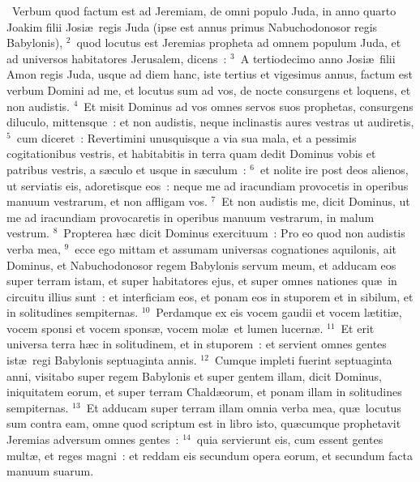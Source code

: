 ~Verbum quod factum est ad Jeremiam, de omni populo Juda, in anno quarto Joakim filii Josi\ae\ regis Juda (ipse est annus primus Nabuchodonosor regis Babylonis),
${}^{2}$~quod locutus est Jeremias propheta ad omnem populum Juda, et ad universos habitatores Jerusalem, dicens~:
${}^{3}$~A tertiodecimo anno Josi\ae\ filii Amon regis Juda, usque ad diem hanc, iste tertius et vigesimus annus, factum est verbum Domini ad me, et locutus sum ad vos, de nocte consurgens et loquens, et non audistis.
${}^{4}$~Et misit Dominus ad vos omnes servos suos prophetas, consurgens diluculo, mittensque~: et non audistis, neque inclinastis aures vestras ut audiretis,
${}^{5}$~cum diceret~: Revertimini unusquisque a via sua mala, et a pessimis cogitationibus vestris, et habitabitis in terra quam dedit Dominus vobis et patribus vestris, a s\ae culo et usque in s\ae culum~:
${}^{6}$~et nolite ire post deos alienos, ut serviatis eis, adoretisque eos~: neque me ad iracundiam provocetis in operibus manuum vestrarum, et non affligam vos.
${}^{7}$~Et non audistis me, dicit Dominus, ut me ad iracundiam provocaretis in operibus manuum vestrarum, in malum vestrum.
${}^{8}$~Propterea h\ae c dicit Dominus exercituum~: Pro eo quod non audistis verba mea,
${}^{9}$~ecce ego mittam et assumam universas cognationes aquilonis, ait Dominus, et Nabuchodonosor regem Babylonis servum meum, et adducam eos super terram istam, et super habitatores ejus, et super omnes nationes qu\ae\ in circuitu illius sunt~: et interficiam eos, et ponam eos in stuporem et in sibilum, et in solitudines sempiternas.
${}^{10}$~Perdamque ex eis vocem gaudii et vocem l\ae titi\ae , vocem sponsi et vocem spons\ae , vocem mol\ae\ et lumen lucern\ae .
${}^{11}$~Et erit universa terra h\ae c in solitudinem, et in stuporem~: et servient omnes gentes ist\ae\ regi Babylonis septuaginta annis.
${}^{12}$~Cumque impleti fuerint septuaginta anni, visitabo super regem Babylonis et super gentem illam, dicit Dominus, iniquitatem eorum, et super terram Chald\ae orum, et ponam illam in solitudines sempiternas.
${}^{13}$~Et adducam super terram illam omnia verba mea, qu\ae\ locutus sum contra eam, omne quod scriptum est in libro isto, qu\ae cumque prophetavit Jeremias adversum omnes gentes~:
${}^{14}$~quia servierunt eis, cum essent gentes mult\ae , et reges magni~: et reddam eis secundum opera eorum, et secundum facta manuum suarum.


